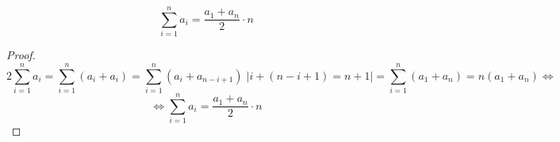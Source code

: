 \begin{theorem}
\begin{equation*}
\sum_{i=1}^n a_i = \frac{a_1 + a_n}2 \cdot n
\end{equation*}
\end{theorem}
\begin{proof}
\begin{equation*}
2 \sum_{i=1}^n a_i =
\sum_{i=1}^n (a_i + a_i) =
\sum_{i=1}^n (a_i + a_{n-i+1}) \;
\left| i + (n - i + 1) = n + 1 \right| =
\sum_{i=1}^n (a_1 + a_n) =
n(a_1 + a_n) \Leftrightarrow
\end{equation*}
\begin{equation*}
\Leftrightarrow \sum_{i=1}^n a_i = \frac{a_1 + a_n}2 \cdot n
\end{equation*}
\end{proof}